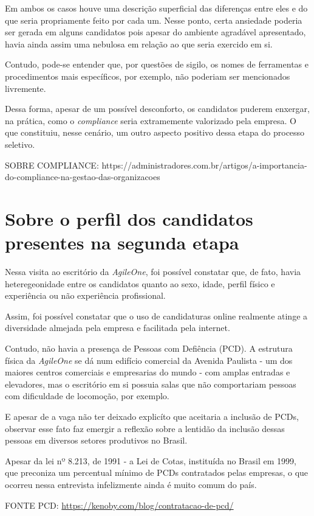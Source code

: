 \documentclass[12pt]{article}
\begin{document}
Em ambos os casos houve uma descrição superficial das diferenças entre eles e do que seria propriamente feito por cada um. Nesse ponto, certa ansiedade poderia ser gerada em alguns candidatos pois apesar do ambiente agradável apresentado, havia ainda assim uma nebulosa em relação ao que seria exercido em si. 

Contudo, pode-se entender que, por questões de sigilo, os nomes de ferramentas e procedimentos mais específicos, por exemplo, não poderiam ser mencionados livremente. 

Dessa forma, apesar de um possível desconforto, os candidatos puderem enxergar, na prática, como o \emph{compliance} seria extramemente valorizado pela empresa. O que constituiu, nesse cenário, um outro aspecto positivo dessa etapa do processo seletivo.

SOBRE COMPLIANCE: https://administradores.com.br/artigos/a-importancia-do-compliance-na-gestao-das-organizacoes

\section*{Sobre o perfil dos candidatos presentes na segunda etapa}

Nessa visita ao escritório da \textit{AgileOne}, foi possível constatar que, de fato, havia heteregeonidade entre os candidatos quanto ao sexo, idade, perfil físico e experiência ou não experiência profissional. 

Assim, foi possível constatar que o uso de candidaturas online realmente atinge a diversidade almejada pela empresa e facilitada pela internet. 

Contudo, não havia a presença de Pessoas com Defiência (PCD). A estrutura física da \emph {AgileOne} se dá num edifício comercial da Avenida Paulista - um dos maiores centros comerciais e empresarias do mundo  - com amplas entradas e elevadores, mas o escritório em si possuia salas que não comportariam pessoas com dificuldade de locomoção, por exemplo. 

E apesar de a vaga não ter deixado explicíto que aceitaria a inclusão de PCDs, observar esse fato faz emergir a reflexão sobre a lentidão da  inclusão dessas pessoas em diversos setores produtivos no  Brasil.

Apesar da  lei nº 8.213, de 1991 -  a Lei de Cotas, instituída no Brasil em 1999, que preconiza  um percentual mínimo de PCDs contratados pelas empresas,  o que ocorreu nessa entrevista infelizmente ainda é muito comum do país.

FONTE PCD: \url {https://kenoby.com/blog/contratacao-de-pcd/}
\end{document}
